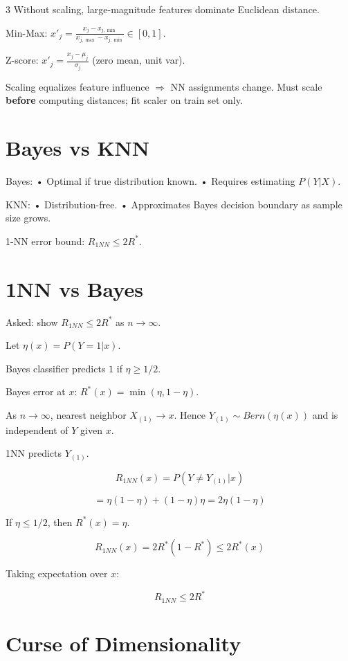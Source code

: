 \documentclass[8pt,fleqn]{extarticle}
\begin{document}
\begin{multicols}{3}
Without scaling, large-magnitude features dominate Euclidean distance.

Min-Max: $x'_j=\frac{x_j-x_{j,\min}}{x_{j,\max}-x_{j,\min}}\in[0,1]$.

Z-score: $x'_j=\frac{x_j-\mu_j}{\sigma_j}$ (zero mean, unit var).

Scaling equalizes feature influence $\Rightarrow$ NN assignments change.
Must scale \textbf{before} computing distances; fit scaler on train set only.


\section*{Bayes vs KNN}

Bayes:
• Optimal if true distribution known.
• Requires estimating $P(Y|X)$.

KNN:
• Distribution-free.
• Approximates Bayes decision boundary
as sample size grows.

1-NN error bound:
$R_{1NN}\le 2R^*$.

\section*{1NN vs Bayes}

Asked: show $R_{1NN}\le 2R^*$ as $n\to\infty$.

Let $\eta(x)=P(Y=1|x)$.

Bayes classifier predicts $1$ if $\eta\ge 1/2$.

Bayes error at $x$:
$R^*(x)=\min(\eta,1-\eta)$.

As $n\to\infty$, nearest neighbor $X_{(1)}\to x$.
Hence $Y_{(1)}\sim Bern(\eta(x))$ and is independent of $Y$ given $x$.

1NN predicts $Y_{(1)}$.

\[
R_{1NN}(x)=P(Y\neq Y_{(1)}|x)
\]

\[
=\eta(1-\eta)+(1-\eta)\eta
=2\eta(1-\eta)
\]

If $\eta\le1/2$, then $R^*(x)=\eta$.

\[
R_{1NN}(x)=2R^*(1-R^*)\le2R^*(x)
\]

Taking expectation over $x$:

\[
R_{1NN}\le 2R^*
\]


\section*{Curse of Dimensionality}


\end{multicols}
\end{document}
